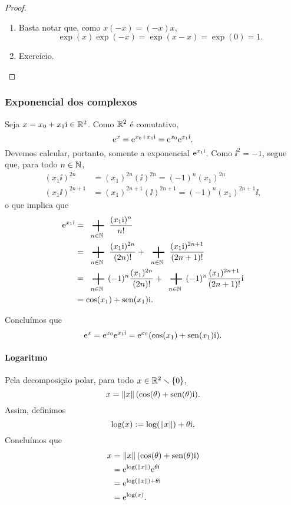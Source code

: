 \begin{proof}
\begin{enumerate}
	\item Basta notar que, como $x(-x)=(-x)x$,
		\begin{equation*}
		\exp(x)\exp(-x) = \exp(x-x) = \exp(0) = 1.
		\end{equation*}

	\item Exercício. \qedhere
	\end{enumerate}
\end{proof}


\subsubsection{Exponencial dos complexos}

Seja $x = x_0 + x_1 \mathrm{i} \in \mathbb{R}^2$. Como $\mathbb{R}^2$ é comutativo,
	\begin{equation*}
	\mathrm{e}^{x} = \mathrm{e}^{x_0 + x_1 \mathrm{i}} = \mathrm{e}^{x_0}\mathrm{e}^{x_1 \mathrm{i}}.
	\end{equation*}
Devemos calcular, portanto, somente a exponencial $\mathrm{e}^{x_1 \mathrm{i}}$. Como $\ii^2 = -1$, segue que, para todo $n \in \mathbb{N}$,
	\begin{align*}
	(x_1 \ii)^{2n} &= (x_1)^{2n}(\ii)^{2n} = (-1)^n (x_1)^{2n} \\
	(x_1 \ii)^{2n+1} &= (x_1)^{2n+1}(\ii)^{2n+1} = (-1)^n (x_1)^{2n+1}\ii,
	\end{align*}
o que implica que
	\begin{align*}
	\e^{x_1 \ii} &= \sum_{n \in \N} \frac{(x_1 \ii)^n}{n!} \\
		&= \sum_{n \in \N} \frac{(x_1 \ii)^{2n}}{(2n)!} + \sum_{n \in \N} \frac{(x_1 \ii)^{2n+1}}{(2n+1)!} \\
		&= \sum_{n \in \N} (-1)^n \frac{(x_1)^{2n}}{(2n)!} + \sum_{n \in \N} (-1)^n \frac{(x_1)^{2n+1}}{(2n+1)!}\ii \\
		&= \cos(x_1) + \sin(x_1)\ii.
	\end{align*}

Concluímos que
	\begin{equation*}
	\mathrm{e}^{x} = \mathrm{e}^{x_0}\mathrm{e}^{x_1 \mathrm{i}} = \mathrm{e}^{x_0}(\cos(x_1) + \operatorname{sen}(x_1)\mathrm{i}).
	\end{equation*}

\paragraph{Logaritmo} Pela decomposição polar, para todo $x \in \mathbb{R}^2 \smallsetminus \{0\}$,
	\begin{equation*}
	x = \left\Vert{x}\right\Vert(\cos(\theta)+\operatorname{sen}(\theta)\mathrm{i}).
	\end{equation*}
Assim, definimos
	\begin{equation*}
	\log(x) := \log(\left\Vert{x}\right\Vert) + \theta \mathrm{i},
	\end{equation*}
Concluímos que
	\begin{align*}
	x &= \left\Vert{x}\right\Vert(\cos(\theta)+\operatorname{sen}(\theta) \mathrm{i}) \\
		&= \mathrm{e}^{\log(\left\Vert{x}\right\Vert)}\mathrm{e}^{\theta \mathrm{i}} \\
		&= \mathrm{e}^{\log(\left\Vert{x}\right\Vert) + \theta \mathrm{i}} \\
		&= \mathrm{e}^{\log(x)}.
	\end{align*}


